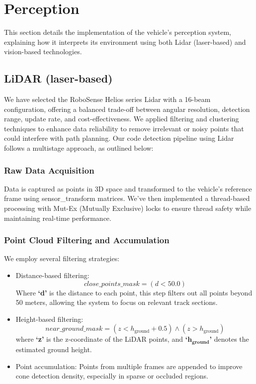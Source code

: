 \documentclass[conference]{IEEEtran}
\begin{document}
\section{Perception}
This section details the implementation of the vehicle's perception system, explaining how it interprets its environment using both Lidar (laser-based) and vision-based technologies.

\subsection{LiDAR (laser-based)}\label{AA}
We have selected the RoboSense Helios series Lidar with a 16-beam configuration, offering a balanced trade-off between angular resolution, detection range, update rate, and cost-effectiveness. We applied filtering and clustering techniques to enhance data reliability to remove irrelevant or noisy points that could interfere with path planning. Our code detection pipeline using Lidar follows a multistage approach, as outlined below:
\subsubsection{Raw Data Acquisition}
Data is captured as points in 3D space and transformed to the vehicle's reference frame using sensor\_transform matrices. We've then implemented a thread-based processing with Mut-Ex (Mutually Exclusive) locks to ensure thread safety while maintaining real-time performance.
\subsubsection{Point Cloud Filtering and Accumulation}
We employ several filtering strategies:
\begin{itemize}
    \item Distance-based filtering:
    \[
    \mathit{close\_points\_mask} = \left( d < 50.0 \right)
    \]
    Where \textbf{‘d’} is the distance to each point, this step filters out all points beyond 50 meters, allowing the system to focus on relevant track sections.

    \item Height-based filtering:
    \[
    \mathit{near\_ground\_mask} = \left( z < h_{\text{ground}} + 0.5 \right) \land \left( z > h_{\text{ground}} \right)
    \]
    where \textbf{‘z’} is the z-coordinate of the LiDAR points, and \textbf{‘$\bm{h_{\text{ground}}}$’} denotes the estimated ground height.

    \item Point accumulation: Points from multiple frames are appended to improve cone detection density, especially in sparse or occluded regions.
\end{itemize}
\end{document}
